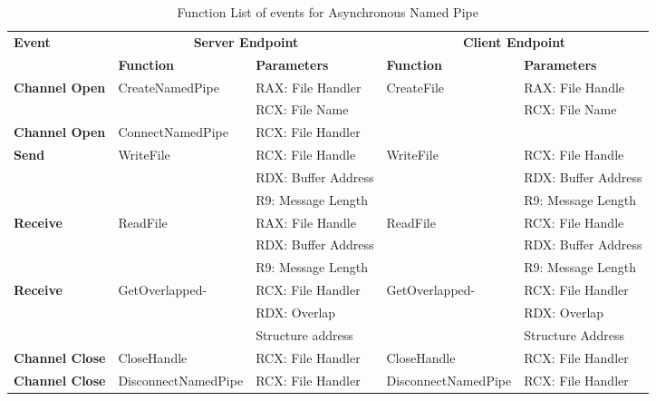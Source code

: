     \begin{table}[H]
        \centering
        \small
        \caption{Function List  of events for Asynchronous Named Pipe}
        \label{asynfunctions}
        \begin{tabular}{|l|l|l|l|l|}
            \hline
             \multirow{2}{*}{\textbf{Event}} &
               \multicolumn{2}{c|}{\textbf{Server Endpoint}} &
               \multicolumn{2}{c|}{\textbf{Client Endpoint}} \\
             \cline{2-5}
              & \textbf{Function}& \textbf{Parameters} & \textbf{Function} & \textbf{Parameters}  \\
             \hline
             \multirow{2}{*}{{\textbf{Channel Open}}}
             &\multirow{2}{*}{{CreateNamedPipe}} &  RAX: File Handler & \multirow{2}{*}{CreateFile} &  RAX: File Handle\\
              \cline{3-3} \cline{5-5}
             &&  RCX: File Name &  &  RCX: File Name\\
            \hline
            {{\textbf{Channel Open}}}
             &{ConnectNamedPipe} & {RCX: File Handler} & & \\
            \hline
             \multirow{3}{*}{{\textbf{Send}}}
             &\multirow{3}{*}{WriteFile} &  RCX: File Handle & \multirow{3}{*}{WriteFile} &  RCX: File Handle\\
              \cline{3-3} \cline{5-5}
             &&  RDX: Buffer Address &  &  RDX: Buffer Address\\
                           \cline{3-3} \cline{5-5}
             & &  R9: Message Length &  &  R9: Message Length\\
            \hline
            \multirow{3}{*}{{\textbf{Receive}}}
             & \multirow{3}{*}{ReadFile}&  RAX: File Handle & \multirow{3}{*}{ReadFile} &  RCX: File Handle\\
              \cline{3-3} \cline{5-5}
              &&  RDX: Buffer Address &  &  RDX: Buffer Address\\
                           \cline{3-3} \cline{5-5}
             & &  R9: Message Length &  &  R9: Message Length\\
              \hline
               \multirow{2}{*}{{\textbf{Receive}}}
             & \multirow{2}{*}{GetOverlapped-}&  RCX: File Handler & \multirow{2}{*}{GetOverlapped-} &  RCX: File Handler\\
              \cline{3-3} \cline{5-5}
             &  \multirow{2}{*}{Result} &  RDX:  Overlap  &  \multirow{2}{*}{Result }&  RDX:  Overlap \\
              &  &  Structure address &  &  Structure Address\\
            \hline                       
            \textbf{Channel Close}
             &{CloseHandle} &{RCX: File Handler} & {CloseHandle} &  {RCX: File Handler}\\
            \hline
           {{\textbf{Channel Close}}}
             &{DisconnectNamedPipe} & {RCX: File Handler} & {DisconnectNamedPipe} & {RCX: File Handler}\\
            \hline
        \end{tabular}
    \end{table}
    
